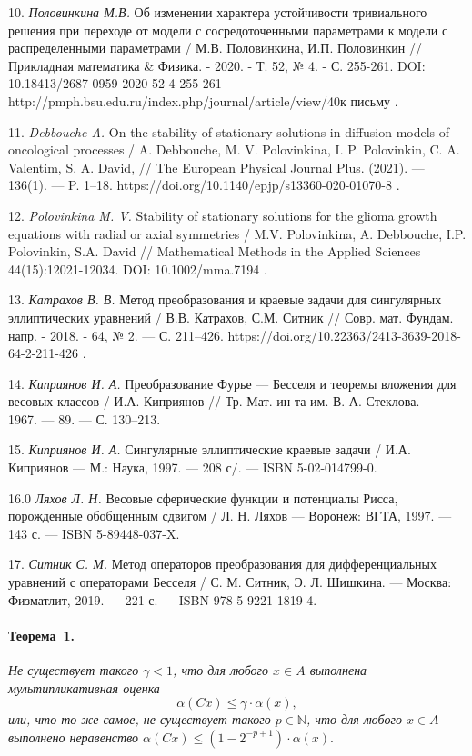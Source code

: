 10. {\it Половинкина М.В.} Об изменении характера устойчивости
тривиального решения при переходе от модели с сосредоточенными
параметрами к модели с распределенными параметрами / М.В.
Половинкина, И.П. Половинкин // Прикладная математика $\&$ Физика.
- 2020. -  Т. 52, № 4. - С. 255-261. DOI:
10.18413/2687-0959-2020-52-4-255-261
http://pmph.bsu.edu.ru/index.php/journal/article/view/40к письму .


11. {\it Debbouche A.} On the stability of stationary solutions in
diffusion models of oncological processes / A. Debbouche, M. V.
Polovinkina, I. P. Polovinkin, C. A. Valentim, S. A. David, // The
European Physical Journal Plus. (2021). --- 136(1). --- P. 1--18.
https://doi.org/10.1140/epjp/s13360-020-01070-8 .

12. {\it  Polovinkina M. V.} Stability of stationary solutions for
the glioma growth equations with radial or axial symmetries / M.V.
Polovinkina, A. Debbouche, I.P. Polovinkin, S.A. David //
Mathematical Methods in the Applied Sciences 44(15):12021-12034.
DOI: 10.1002/mma.7194 .

13. {\it Катрахов В. В.} Метод преобразования и краевые задачи для
сингулярных эллиптических уравнений / В.В. Катрахов, С.М. Ситник
// Совр. мат. Фундам. напр. - 2018. - 64, № 2. --- С. 211--426.
https://doi.org/10.22363/2413-3639-2018-64-2-211-426 .

14. {\it Киприянов И. А.} Преобразование Фурье --- Бесселя и
теоремы вложения для весовых классов / И.А. Киприянов // Тр. Мат.
ин-та им. В. А. Стеклова. --- 1967. --- 89. --- С. 130--213.

15. {\it Киприянов И. А.} Сингулярные эллиптические краевые задачи
/ И.А. Киприянов --- М.: Наука, 1997. --- 208 с/. --- ISBN
5-02-014799-0.

16.0 {\it Ляхов Л. Н.} Весовые сферические функции и потенциалы
Рисса, порожденные обобщенным сдвигом / Л. Н. Ляхов --- Воронеж:
ВГТА, 1997. --- 143 с. --- ISBN 5-89448-037-X.

17. {\it Ситник С. М.} Метод операторов преобразования для
дифференциальных уравнений с операторами Бесселя / С. М. Ситник,
Э. Л. Шишкина. --- Москва: Физматлит, 2019. --- 221 с. --- ISBN
978-5-9221-1819-4.







\paragraph{Теорема~1.}
{\it
    Не существует такого $\gamma < 1$,
    что для любого $x\in A$ выполнена мультипликативная оценка
    $$
        \alpha(Cx) \leqslant \gamma \cdot \alpha(x)
    ,
    $$
или, что то же самое, не существует такого $p\in \mathbb{N}$,
    что для любого $x\in A$ выполнено неравенство
    $
        \alpha(Cx) \leqslant (1-2^{-p+1})\cdot \alpha(x).
    $
}

